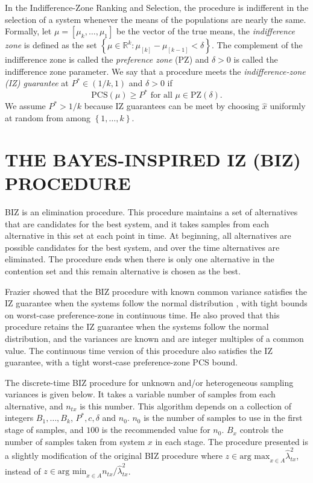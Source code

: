 \documentclass{wscpaperproc}
\newcommand{\lambdahat}{\widehat{\lambda}}
\theoremstyle{wsc}
\begin{document}
In the Indifference-Zone Ranking and Selection, the procedure is indifferent
in the selection of a system whenever the means of the populations
are nearly the same. Formally, let $\mu=\left[\mu_{k},\ldots,\mu_{1}\right]$
be the vector of the true means, the \emph{indifference zone} is defined
as the set $\left\{ \mu\in\mathbb{R}^{k}:\mu_{\left[k\right]}-\mu_{\left[k-1\right]}<\delta\right\} $.
The complement of the indifference zone is called the \emph{preference
zone} (PZ) and $\delta>0$ is called the indifference zone parameter.
We say that a procedure meets the \emph{indifference-zone (IZ) guarantee
}at $P^{*}\in\left(1/k,1\right)$ and $\delta>0$ if
\[
\mbox{PCS}\left(\mu\right)\geq P^{*}\mbox{ for all }\mu\in\mbox{PZ}\left(\delta\right).
\]
We assume $P^{*}>1/k$ because IZ guarantees can be meet by choosing
$\hat{x}$ uniformly at random from among $\left\{ 1,\ldots,k\right\} $.


\section{THE BAYES-INSPIRED IZ (BIZ) PROCEDURE}
\label{sec:BIZ}

BIZ is an elimination procedure. This procedure maintains a set of
alternatives that are candidates for the best system, and it takes samples from each
alternative in this set at each point in time. At beginning, all alternatives
are possible candidates for the best system, and over the time alternatives are eliminated.
The procedure ends when there is only one alternative in the contention
set and this remain alternative is chosen as the best. 

Frazier \cite{Frazier:BIZ} showed that the BIZ procedure with known common variance
satisfies the IZ guarantee when the systems follow the normal distribution
, with tight bounds on worst-case preference-zone in continuous time.
He also proved that this procedure retains the IZ guarantee when the
systems follow the normal distribution, and the variances are known
and are integer multiples of a common value. The continuous time version
of this procedure also satisfies the IZ guarantee, with a tight worst-case
preference-zone PCS bound.

The discrete-time BIZ procedure for unknown and/or heterogeneous sampling
variances is given below.  It takes a variable number of samples
from each alternative, and $n_{tx}$ is this number. This algorithm
depends on a collection of integers $B_{1},\ldots,B_{k}$, $P^{*},c,\delta$
and $n_{0}$. $n_{0}$ is the number of samples to use in the first
stage of samples, and $100$ is the recommended value for $n_{0}$.
$B_{x}$ controls the number of samples taken from system $x$ in
each stage. The procedure presented is a slightly modification of the original BIZ 
procedure where $z \in \mbox{arg max}_{x\in A} \lambdahat^2_{tx}$, instead 
of $z \in \mbox{arg min}_{x\in A} n_{tx} / \lambdahat^2_{tx}$.
\end{document}
